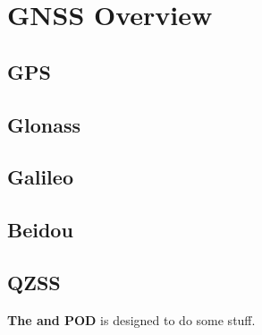 \chapter{GNSS Overview}
\label{ch:GNSSOverview}

\section{GPS}

\section{Glonass}

\section{Galileo}

\section{Beidou}

\section{QZSS}

\textbf{The  and POD} is designed to do some stuff.